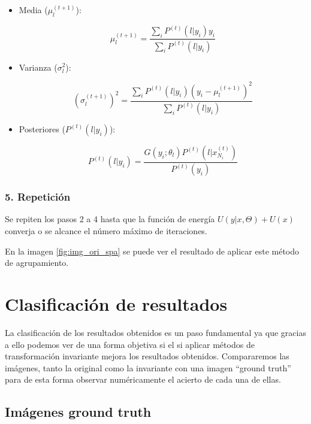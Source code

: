 \begin{itemize}
\setlength{\itemsep}{-1ex}
   \item{\begin{flushleft} Media ($\mu_l^{(t+1)}$): \end{flushleft}}

    $$\mu_l^{(t+1)} =\frac{\sum_i P^{(t)} (l|y_i )y_i }{\sum_i P^{(t)} (l|y_i )}$$

   \item{\begin{flushleft} Varianza ($\sigma_l^2$): \end{flushleft}}

    $$(\sigma_l^{(t+1)} )^2 =\frac{\sum_i P^{(t)} (l|y_i )(y_i -\mu_l^{(t+1)} )^2 }{\sum_i P^{(t)} (l|y_i )}$$

   \item{\begin{flushleft} Posteriores ($P^{(t)} (l|y_i )$): \end{flushleft}}

    $$P^{(t)} (l|y_i )=\frac{G(y_i ;\theta_l )P^{(t)} (l|x_{N_i }^{(t)} )}{P^{(t)} (y_i )}$$
\end{itemize}

\subsubsection{5. Repetición}

Se repiten los pasos 2 a 4 hasta que la función de energía $U(y|x,\Theta )+U(x)$ converja o se alcance el número máximo de iteraciones.

En la imagen \ref{fig:img_ori_spa} se puede ver el resultado de aplicar este método de agrupamiento.

\section{Clasificación de resultados}\label{clasificacion-de-resultados}

La clasificación de los resultados obtenidos es un paso fundamental ya que gracias a ello podemos ver de una forma objetiva si el si aplicar métodos de transformación invariante mejora los resultados obtenidos. Compararemos las imágenes, tanto la original como la invariante con una imagen ``ground truth'' para de esta forma observar numéricamente el acierto de cada una de ellas.

\subsection{Imágenes ground truth}\label{imagenes-ground-truth}

